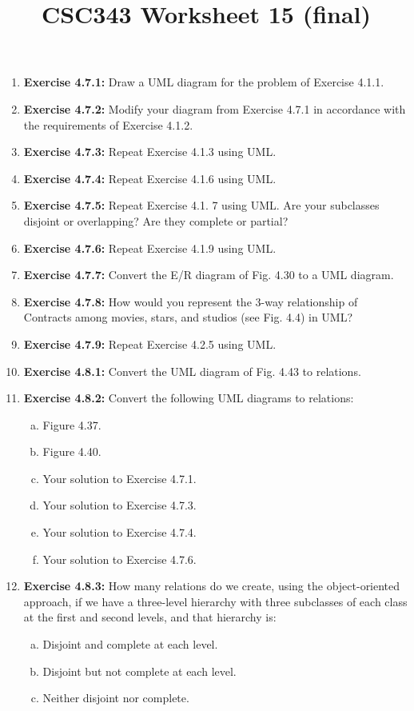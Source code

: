 \documentclass[12pt]{article}
\begin{document}
\title{CSC343 Worksheet 15 (final)}
\maketitle

\begin{enumerate}[1.]
    \item \textbf{Exercise 4.7.1:} Draw a UML diagram for the problem of Exercise 4.1.1.
    \item \textbf{Exercise 4.7.2:} Modify your diagram from Exercise 4.7.1 in accordance with the requirements of Exercise 4.1.2.
    \item \textbf{Exercise 4.7.3:} Repeat Exercise 4.1.3 using UML.
    \item \textbf{Exercise 4.7.4:} Repeat Exercise 4.1.6 using UML.
    \item \textbf{Exercise 4.7.5:} Repeat Exercise 4.1. 7 using UML. Are your subclasses disjoint or overlapping? Are they complete or partial?
    \item \textbf{Exercise 4.7.6:} Repeat Exercise 4.1.9 using UML.
    \item \textbf{Exercise 4.7.7:} Convert the E/R diagram of Fig. 4.30 to a UML diagram.
    \item \textbf{Exercise 4.7.8:} How would you represent the 3-way relationship of Contracts among movies, stars, and studios (see Fig. 4.4) in UML?
    \item \textbf{Exercise 4.7.9:} Repeat Exercise 4.2.5 using UML.
    \item \textbf{Exercise 4.8.1:} Convert the UML diagram of Fig. 4.43 to relations.
    \item \textbf{Exercise 4.8.2:} Convert the following UML diagrams to relations:

    \begin{enumerate}[a)]
        \item Figure 4.37.
        \item Figure 4.40.
        \item Your solution to Exercise 4.7.1.
        \item Your solution to Exercise 4.7.3.
        \item Your solution to Exercise 4.7.4.
        \item Your solution to Exercise 4.7.6.
    \end{enumerate}

    \item \textbf{Exercise 4.8.3:} How many relations do we create, using the object-oriented
    approach, if we have a three-level hierarchy with three subclasses of each class
    at the first and second levels, and that hierarchy is:

    \begin{enumerate}[a)]
        \item Disjoint and complete at each level.
        \item Disjoint but not complete at each level.
        \item Neither disjoint nor complete.
    \end{enumerate}
\end{enumerate}
\end{document}
